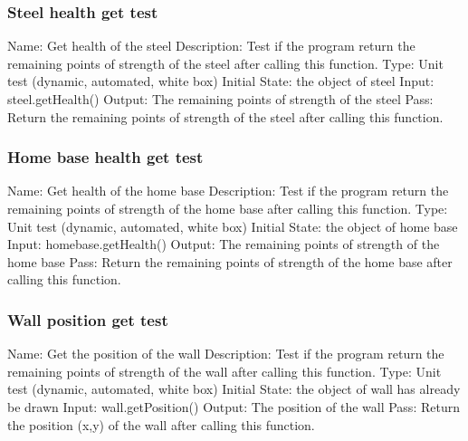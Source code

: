 \documentclass{article}
\begin{document}
\subsubsection{Steel health get test}
Name:  Get health of the steel\newline
Description: Test if the program return the remaining points of strength of the steel after calling this function. \newline
Type: Unit test (dynamic, automated, white box) \newline
Initial State:  the object of steel\newline
Input: steel.getHealth()\newline
Output: The remaining points of strength of the steel\newline
Pass:  Return the remaining points of strength of the steel after calling this function. \newline

\subsubsection{Home base health get test}
Name:  Get health of the home base\newline
Description: Test if the program return the remaining points of strength of the home base after calling this function. \newline
Type: Unit test (dynamic, automated, white box) \newline
Initial State:  the object of home base\newline
Input: homebase.getHealth()\newline
Output: The remaining points of strength of the home base\newline
Pass:  Return the remaining points of strength of the home base after calling this function. \newline

\subsubsection{Wall position get test}
Name:  Get the position of the wall\newline
Description: Test if the program return the remaining points of strength of the wall after calling this function. \newline
Type: Unit test (dynamic, automated, white box) \newline
Initial State:  the object of wall has already be drawn\newline
Input: wall.getPosition()\newline
Output: The position of the wall\newline
Pass:  Return the position (x,y) of the wall after calling this function. \newline
\end{document}
